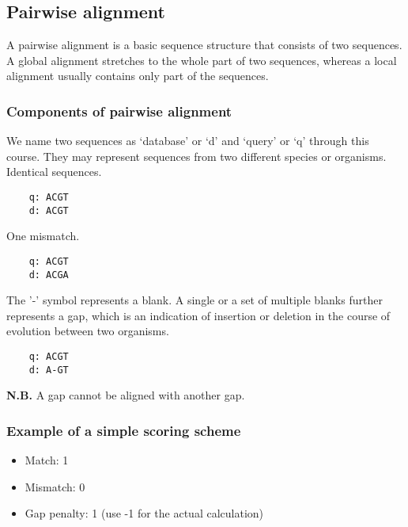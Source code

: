 %
%

%
%
\subsection{Pairwise alignment}
A pairwise alignment is a basic sequence structure that consists of two sequences. A global alignment stretches to the whole part of two sequences, whereas a local alignment usually contains only part of the sequences.

%
%
\subsubsection*{Components of pairwise alignment}

We name two sequences as ‘database’ or ‘d’ and ‘query’ or ‘q’ through this course. They may represent sequences from two different species or organisms.
\\

\noindent
Identical sequences.
\begin{verbatim}
    q: ACGT
    d: ACGT
\end{verbatim}

\noindent
One mismatch.
\begin{verbatim}
    q: ACGT
    d: ACGA
\end{verbatim}

\noindent
The '-' symbol represents a blank. A single or a set of multiple blanks further represents a gap, which is an indication of insertion or deletion in the course of evolution between two organisms.
\begin{verbatim}
    q: ACGT
    d: A-GT
\end{verbatim}

\noindent
\textbf{N.B.} A gap cannot be aligned with another gap.

%
%
\subsubsection*{Example of a simple scoring scheme}
\begin{itemize}
\item Match: 1
\item Mismatch: 0
\item Gap penalty: 1 (use -1 for the actual calculation)
\end{itemize}

